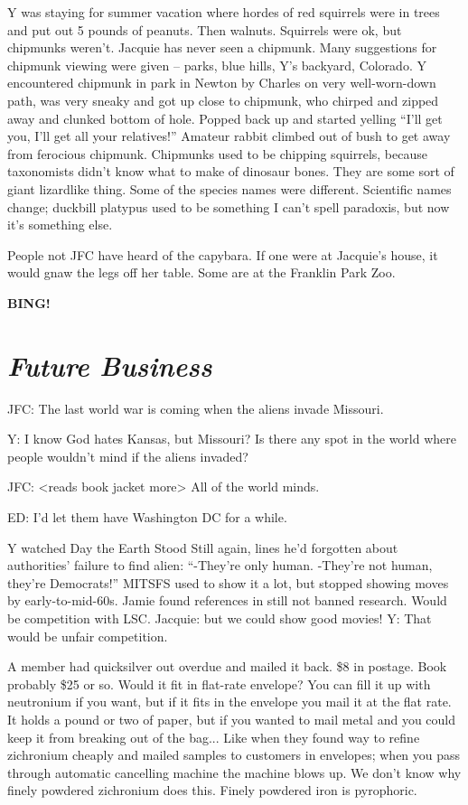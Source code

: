 \documentclass[10pt]{article}
\newcommand{\bing}{{\bf BING!} }
\newcommand{\goto}[1]{\bing \vskip 12pt \section*{{\em{#1}}}}
\begin{document}
Y was staying for summer vacation where hordes of red squirrels were
in trees and put out 5 pounds of peanuts.  Then walnuts.  Squirrels
were ok, but chipmunks weren't.  Jacquie has never seen a chipmunk.
Many suggestions for chipmunk viewing were given -- parks, blue hills,
Y's backyard, Colorado.  Y encountered chipmunk in park in Newton by
Charles on very well-worn-down path, was very sneaky and got up close
to chipmunk, who chirped and zipped away and clunked bottom of hole.
Popped back up and started yelling ``I'll get you, I'll get all your
relatives!''  Amateur rabbit climbed out of bush to get away from
ferocious chipmunk.  Chipmunks used to be chipping squirrels, because
taxonomists didn't know what to make of dinosaur bones.  They are some
sort of giant lizardlike thing.  Some of the species names were
different.  Scientific names change; duckbill platypus used to be
something I can't spell paradoxis, but now it's something else.

People not JFC have heard of the capybara.  If one were at Jacquie's
house, it would gnaw the legs off her table.  Some are at the Franklin
Park Zoo.


\goto{Future Business}

JFC: The last world war is coming when the aliens invade Missouri.

Y: I know God hates Kansas, but Missouri?  Is there any spot in the
world where people wouldn't mind if the aliens invaded?

JFC: <reads book jacket more> All of the world minds.

ED: I'd let them have Washington DC for a while.

Y watched Day the Earth Stood Still again, lines he'd forgotten about
authorities' failure to find alien: ``-They're only human.  -They're
not human, they're Democrats!''  MITSFS used to show it a lot, but
stopped showing moves by early-to-mid-60s.  Jamie found references in
still not banned research.  Would be competition with LSC.  Jacquie:
but we could show good movies!  Y: That would be unfair competition.

A member had quicksilver out overdue and mailed it back.  \$8 in
postage.  Book probably \$25 or so.  Would it fit in flat-rate
envelope?  You can fill it up with neutronium if you want, but if it
fits in the envelope you mail it at the flat rate.  It holds a pound
or two of paper, but if you wanted to mail metal and you could keep it
from breaking out of the bag... Like when they found way to refine
zichronium cheaply and mailed samples to customers in envelopes; when
you pass through automatic cancelling machine the machine blows up.
We don't know why finely powdered zichronium does this.  Finely
powdered iron is pyrophoric.  
\end{document}
